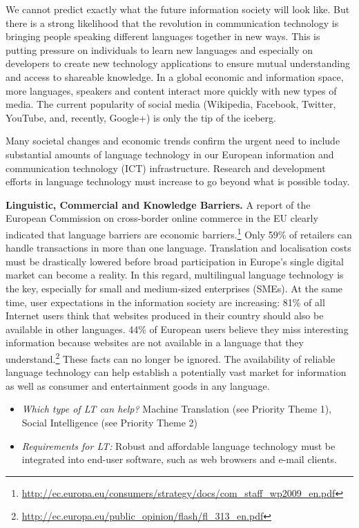 \begin{multicols}{2}
We cannot predict exactly what the future information society will look like. But there is a strong likelihood that the revolution in communication technology is bringing people speaking different languages together in new ways. This is putting pressure on individuals to learn new languages and especially on developers to create new technology applications to ensure mutual understanding and access to shareable knowledge. In a global economic and information space, more languages, speakers and content interact more quickly with new types of media. The current popularity of social media (Wikipedia, Facebook, Twitter, YouTube, and, recently, Google+) is only the tip of the iceberg.

Many societal changes and economic trends confirm the urgent need to include substantial amounts of language technology in our European information and communication technology (ICT) infrastructure. Research and development efforts in language technology must increase to go beyond what is possible today.

\textbf{Linguistic, Commercial and Knowledge Barriers.} A report of the European Commission on cross-border online commerce in the EU clearly indicated that language barriers are economic barriers.\footnote{\url{http://ec.europa.eu/consumers/strategy/docs/com_staff_wp2009_en.pdf}}  Only 59\% of retailers can handle transactions in more than one language. Translation and localisation costs must be drastically lowered before broad participation in Europe’s single digital market can become a reality. In this regard, multilingual language technology is the key, especially for small and medium-sized enterprises (SMEs). At the same time, user expectations in the information society are increasing: 81\% of all Internet users think that websites produced in their country should also be available in other languages. 44\% of European users believe they miss interesting information because websites are not available in a language that they understand.\footnote{\url{http://ec.europa.eu/public_opinion/flash/fl_313_en.pdf}} These facts can no longer be ignored. The availability of reliable language technology can help establish a potentially vast market for information as well as consumer and entertainment goods in any language.

\begin{itemize}
\item \emph{Which type of LT can help?} Machine Translation (see Priority Theme 1), Social Intelligence (see Priority Theme 2)
\item \emph{Requirements for LT:} Robust and affordable language technology must be integrated into end-user software, such as web browsers and e-mail clients. 
\end{itemize}


\end{multicols}
